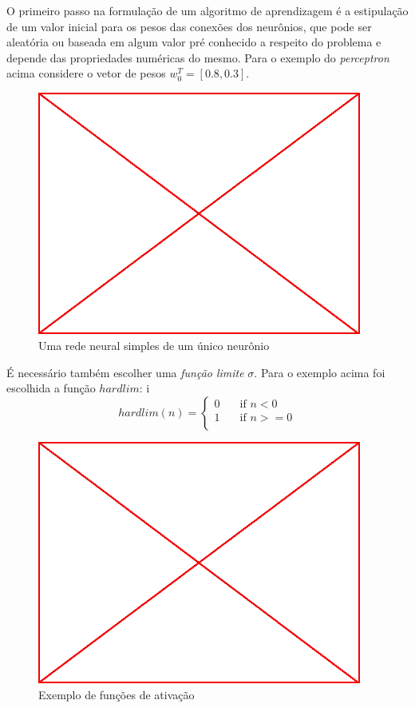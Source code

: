 O primeiro passo na formulação de um algoritmo de aprendizagem é a estipulação
de um valor inicial para os pesos das conexões dos neurônios, que pode ser
aleatória ou baseada em algum valor pré conhecido a respeito do problema e
depende das propriedades numéricas do mesmo. Para o exemplo do
\emph{perceptron} acima considere o vetor de pesos $w_0^T=[0.8,0.3]$.

\begin{figure}\label{fig:simple-perceptron}
  \caption{Uma rede neural simples de um único neurônio}
  \begin{center}
    \includegraphics[height=8cm]{placeholder}
  \end{center}
\end{figure}

É necessário também escolher uma \emph{função limite} $\sigma$. Para o exemplo
acima foi escolhida a função $hardlim$:
i
$$
hardlim(n) = \begin{cases}
  0 & \quad \text{if~} n<0\\
  1 & \quad \text{if~} n>=0\\
  \end{cases}
$$

\begin{figure}\label{fig:limit-functions-exapmple}
  \caption{Exemplo de funções de ativação}
  \begin{center}
    \includegraphics[height=8cm]{placeholder}
  \end{center}
\end{figure}

